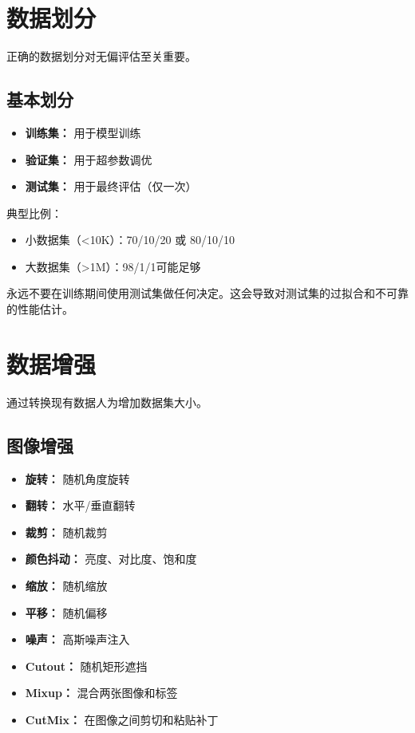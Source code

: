 \section{数据划分}

正确的数据划分对无偏评估至关重要。

\subsection{基本划分}

\begin{itemize}
    \item \textbf{训练集：} 用于模型训练
    \item \textbf{验证集：} 用于超参数调优
    \item \textbf{测试集：} 用于最终评估（仅一次）
\end{itemize}

典型比例：
\begin{itemize}
    \item 小数据集（<10K）：70/10/20 或 80/10/10
    \item 大数据集（>1M）：98/1/1可能足够
\end{itemize}

\begin{note}[测试集泄露]
永远不要在训练期间使用测试集做任何决定。这会导致对测试集的过拟合和不可靠的性能估计。
\end{note}

\section{数据增强}

通过转换现有数据人为增加数据集大小。

\subsection{图像增强}

\begin{itemize}
    \item \textbf{旋转：} 随机角度旋转
    \item \textbf{翻转：} 水平/垂直翻转
    \item \textbf{裁剪：} 随机裁剪
    \item \textbf{颜色抖动：} 亮度、对比度、饱和度
    \item \textbf{缩放：} 随机缩放
    \item \textbf{平移：} 随机偏移
    \item \textbf{噪声：} 高斯噪声注入
    \item \textbf{Cutout：} 随机矩形遮挡
    \item \textbf{Mixup：} 混合两张图像和标签
    \item \textbf{CutMix：} 在图像之间剪切和粘贴补丁
\end{itemize}

